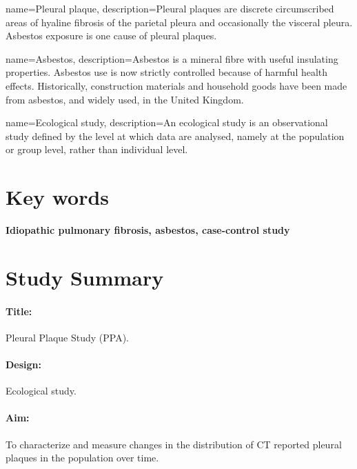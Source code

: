 \documentclass[a4paper,10pt]{article}
\begin{document}
\newpage
 
\tableofcontents

\newpage

  {name=Pleural plaque,
   description={Pleural plaques are discrete circumscribed areas of hyaline fibrosis of the parietal pleura and occasionally the visceral pleura. Asbestos exposure is one cause of pleural plaques.}}

  {name=Asbestos,
   description={Asbestos is a mineral fibre with useful insulating properties. Asbestos use is now strictly controlled because of harmful health effects. Historically, construction materials and household goods have been made from asbestos, and widely used, in the United Kingdom.}}

  {name=Ecological study,
  description={An ecological study is an observational study defined by the level at which data are analysed, namely at the population or group level, rather than individual level.}}


\glsaddall

\printglossary[nonumberlist]

\section*{Key words}

\textbf{Idiopathic pulmonary fibrosis, asbestos, case-control study}

\newpage

\section*{Study Summary}

\paragraph{Title:} Pleural Plaque Study (PPA).
\paragraph{Design:} Ecological study.
\paragraph{Aim:} To characterize and measure changes in the distribution of CT reported pleural plaques in the population over time.
\end{document}
